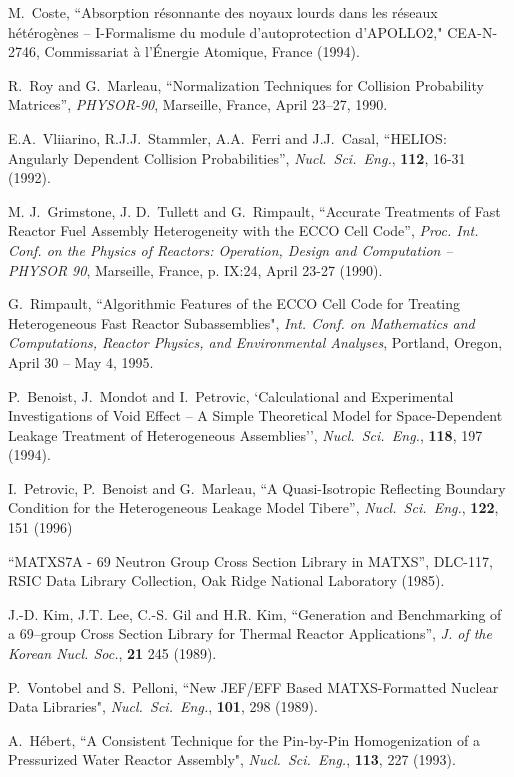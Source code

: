 \begin{thebibliography}{99}
M.~Coste, ``Absorption r\'esonnante des noyaux lourds dans les
r\'eseaux h\'et\'erog\`enes -- I-Formalisme du module
d'autoprotection d'APOLLO2,"
CEA-N-2746, Commissariat \`a l'\'Energie Atomique, France (1994).

R.~Roy and G.~Marleau, ``Normalization Techniques for Collision Probability
Matrices'', {\sl PHYSOR-90}, Marseille, France, April 23--27, 1990.

E.A.~Vliiarino, R.J.J.~Stammler, A.A.~Ferri and J.J.~Casal, ``HELIOS: Angularly
Dependent Collision Probabilities'', {\sl
Nucl.~Sci.~Eng.}, {\bf 112}, 16-31 (1992).

M. J.~Grimstone, J. D.~Tullett and G.~Rimpault, ``Accurate Treatments of
Fast Reactor Fuel Assembly Heterogeneity with the ECCO Cell Code'',
{\sl Proc. Int. Conf. on the Physics of Reactors: Operation, Design and
Computation -- PHYSOR 90}, Marseille, France, p. IX:24, April 23-27 (1990).

G.~Rimpault, ``Algorithmic Features of the ECCO Cell Code for Treating
Heterogeneous Fast Reactor Subassemblies", {\sl Int. Conf. on
Mathematics and Computations, Reactor Physics, and Environmental Analyses},
Portland, Oregon, April 30 -- May 4, 1995.

P.~Benoist, J.~Mondot and I.~Petrovic, `Calculational and Experimental
Investigations of Void Effect -- A Simple Theoretical Model for Space-Dependent
Leakage Treatment of Heterogeneous Assemblies'', {\sl Nucl.~Sci.~Eng.}, {\bf
118}, 197 (1994).

I.~Petrovic, P.~Benoist and G.~Marleau, ``A Quasi-Isotropic Reflecting Boundary
Condition for the Heterogeneous Leakage Model Tibere'', {\sl Nucl.~Sci.~Eng.},
{\bf 122}, 151 (1996)

``MATXS7A - 69 Neutron Group Cross Section Library in MATXS'', DLC-117, RSIC
Data Library  Collection, Oak Ridge National Laboratory (1985).

J.-D. Kim, J.T. Lee, C.-S. Gil and H.R. Kim, ``Generation and Benchmarking of a 69--group Cross Section Library for Thermal Reactor Applications'', {\sl J. of the Korean Nucl. Soc.}, {\bf 21} 245 (1989).

P.~Vontobel and S.~Pelloni, ``New JEF/EFF Based MATXS-Formatted Nuclear Data
Libraries", {\sl Nucl.~Sci.~Eng.}, {\bf 101}, 298 (1989).

A.~H\'ebert, ``A Consistent Technique for the Pin-by-Pin Homogenization of a
Pressurized Water Reactor Assembly", {\sl Nucl.~Sci.~Eng.}, {\bf 113}, 227
(1993).


\end{thebibliography}
